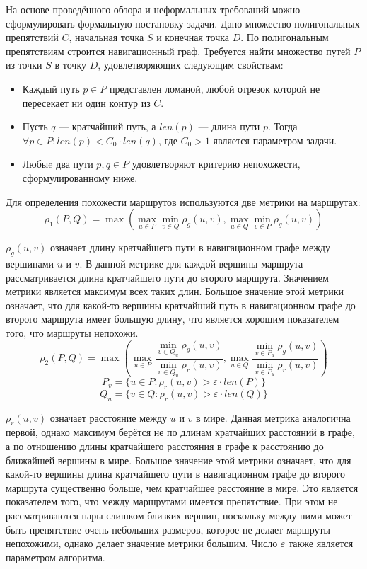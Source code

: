 На основе проведённого обзора и неформальных требований можно
сформулировать формальную постановку задачи. Дано множество
полигональных препятствий $C$, начальная точка $S$ и конечная точка
$D$. По полигональным препятствиям строится навигационный граф.
Требуется найти множество путей $P$ из точки $S$ в точку $D$,
удовлетворяющих следующим свойствам:
\begin{itemize}
  \item Каждый путь $p \in P$ представлен ломаной, любой отрезок
    которой не пересекает ни один контур из $C$.
  \item Пусть $q$ --- кратчайший путь, а $len(p)$ --- длина пути $p$.
    Тогда $\forall p \in P: len(p) < C_0 \cdot len(q)$, где $C_0 > 1$
    является параметром задачи.
  \item Любыe два пути $p, q \in P$ удовлетворяют критерию
    непохожести, сформулированному ниже.
\end{itemize}

Для определения похожести маршрутов используются две метрики на
маршрутах:
\begin{equation*}
    \rho_1 (P, Q) = \max(\max_{u \in P} \min_{v \in Q} \rho_g(u,
    v), \max_{u \in Q} \min_{v \in P} \rho_g(u, v))
\end{equation*}

$\rho_g(u, v)$ означает длину кратчайшего пути в навигационном графе
между вершинами $u$ и $v$. В данной метрике для каждой вершины
маршрута рассматривается длина кратчайшего пути до второго маршрута.
Значением метрики является максимум всех таких длин. Большое значение
этой метрики означает, что для какой-то вершины кратчайший путь в
навигационном графе до второго маршрута имеет большую длину, что
является хорошим показателем того, что маршруты непохожи.
\begin{equation*}
    \rho_2 (P, Q) = \max(\max_{u \in P} \frac{\min\limits_{v \in Q_u}
    \rho_g(u, v)}{\min\limits_{v \in Q_u} \rho_r(u, v)}, \max\limits_{u \in Q} \frac{\min\limits_{v \in P_u}
    \rho_g(u, v)}{\min\limits_{v \in P_u} \rho_r(u, v)})
\end{equation*}
\begin{equation*}
    P_v = \{ u \in P : \rho_r(u, v) > \varepsilon \cdot len(P) \}
\end{equation*}
\begin{equation*}
    Q_u = \{ v \in Q : \rho_r(u, v) > \varepsilon \cdot len(Q) \}
\end{equation*}

$\rho_r(u, v)$ означает расстояние между $u$ и $v$ в мире. Данная
метрика аналогична первой, однако максимум берётся не по длинам
кратчайших расстояний в графе, а по отношению длины кратчайшего
расстояния в графе к расстоянию до ближайшей вершины в мире. Большое
значение этой метрики означает, что для какой-то вершины длина кратчайшего
пути в навигационном графе до второго маршрута существенно больше, чем
кратчайшее расстояние в мире. Это является показателем того, что между
маршрутами имеется препятствие. При этом не рассматриваются пары
слишком близких вершин, поскольку между ними может быть препятствие
очень небольших размеров, которое не делает маршруты непохожими,
однако делает значение метрики большим. Число $\varepsilon$ также
является параметром алгоритма.


